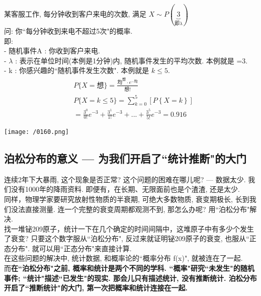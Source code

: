 \documentclass[UTF8]{ctexart}
\begin{document}
\begin{myEnvSample}
	某客服工作, 每分钟收到客户来电的次数, 满足 $	X\sim P\left( \underset{\text{即}\lambda}{\underbrace{3}} \right) 	$ \\
	问: 你``每分钟收到来电不超过5次"的概率. \\
	
	即: \\
	- 随机事件A : 你收到客户来电. \\
	- $\lambda$ : 表示在单位时间(本例是1分钟)内, 随机事件发生的平均次数. 本例就是 =3. \\
	- k : 你感兴趣的``随机事件发生次数". 本例就是 $k \leq 5$.  	
	\begin{align*}  %
	&P\{X=\text{想\}}=\frac{\text{均}^{\text{想}}\cdot e^{-\text{均}}}{\text{想!}}\\
&P\{X=k\leq 5\}=\sum_{k=0}^5{\left[ P\left\{ X=k \right\} \right]}\\
&=\frac{3^0}{0!}e^{-3}+\frac{3^1}{1!}e^{-3}+...+\frac{3^5}{5!}e^{-3}=0.916
	\end{align*}
	
	\texttt{[image: /0160.png]} 
	
	
\end{myEnvSample}



	
	\subsection{泊松分布的意义 ---  为我们开启了``统计推断"的大门} 
	
	连续2年下大暴雨, 这个现象是否正常? 这个问题的困难在哪儿呢? --- 数据太少. 我们没有1000年的降雨资料. 即便有，在长期、无限面前也是个渣渣, 还是太少. \\
	
	同样，物理学家要研究放射性物质的半衰期, 可绝大多数物质, 衰变期极长, 长到我们没法直接测量. 连一个完整的衰变周期都观测不到, 那怎么办呢? 用``泊松分布"解决. \\
	找一堆铋209原子，统计一下在几个确定的时间间隔中，这堆原子中有多少个发生了衰变? 只要这个数字服从``泊松分布", 反过来就证明铋209原子的衰变, 也服从``正态分布". 就可以用``正态分布"来直接计算. \\
	
	在这些问题的解决中, 统计数据, 和概率论的``概率分布 f(x)", 就被连在了一起.   \\
	而\textbf{在``泊松分布"之前, 概率和统计是两个不同的学科. ``概率"研究``未发生"的随机事件; ``统计"描述``已发生"的现实. 那会儿只有描述统计, 没有推断统计. 泊松分布开启了``推断统计"的大门, 第一次把概率和统计连接在一起.} \\
	
\end{document}

